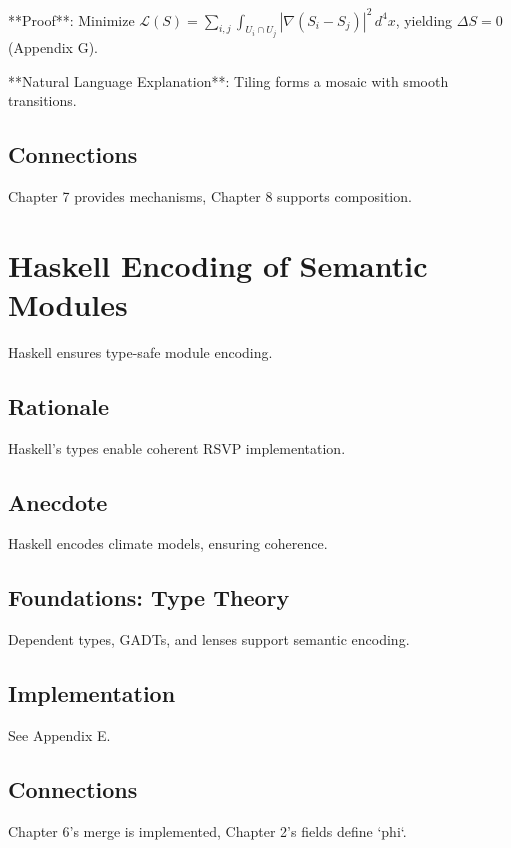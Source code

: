 \documentclass[12pt]{article}
\begin{document}
**Proof**: Minimize $\mathcal{L}(S) = \sum_{i,j} \int_{U_i \cap U_j} |\nabla (S_i - S_j)|^2 \, d^4x$, yielding $\Delta S = 0$ \cite{evans2010partial} (Appendix G).

**Natural Language Explanation**: Tiling forms a mosaic with smooth transitions.

\begin{center}
\end{center}

\subsection{Connections}
Chapter 7 provides mechanisms, Chapter 8 supports composition.

\section{Haskell Encoding of Semantic Modules}
\label{sec:chapter10}

Haskell ensures type-safe module encoding.

\subsection{Rationale}
Haskell’s types enable coherent RSVP implementation.

\subsection{Anecdote}
Haskell encodes climate models, ensuring coherence.

\subsection{Foundations: Type Theory}
Dependent types, GADTs, and lenses support semantic encoding.

\subsection{Implementation}
See Appendix E.

\subsection{Connections}
Chapter 6’s merge is implemented, Chapter 2’s fields define `phi`.
\end{document}

